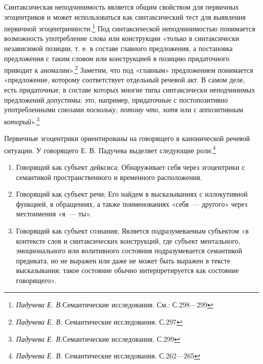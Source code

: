 \documentclass{kursa4}
\begin{document}
{      Синтаксическая неподчинимость является общим свойством для первичных
      эгоцентриков и может использоваться как синтаксический тест для
      выявления первичной
      эгоцентричности.\footnote{\textit{Падучева Е. В.}Семантические исследования. См.: С.298—299} Под синтаксической неподчинимостью понимается возможность употребление слова или
      конструкции «только в синтаксически независимой позиции, т. е. в
      составе главного предложения, а постановка предложения с таким словом
      или конструкцией в позицию придаточного приводит к
      аномалии».\footnote{\textit{ Падучева Е. В.
      }Семантические исследования. С.297} Заметим, что под «главным»
      предложением понимается «предложение, которому соответствует отдельный
      речевой акт. В самом деле, есть придаточные, в составе которых многие
      типы синтаксически неподчинимых предложений допустимы: это, например,
      придаточные с постопозитивно употребленными союзами \textit{поскольку,
      потому что, хотя} или с аппозитивным
      \textit{который}».\footnote{\textit{Падучева Е. В.}Семантические исследования. С.299}

      Первичные эгоцентрики ориентированы на говорящего в канонической
      речевой ситуации. У говорящего Е. В. Падучева выделяет следующие
      роли:\footnote{\textit{Падучева Е. В.} Семантические исследования. С.262—265}

      \liststyleWWNumiii
      \begin{enumerate}

        \item Говорящий как субъект дейксиса; \newline
        Обнаруживает себя через эгоцентрики с семантикой пространственного и
        временного расположения. 

        \item Говорящий как субъект речи; \newline
        Его найдем в высказываниях с иллокутивной функцией, в обращениях, а
        также поименованиях «себя~--- другого» через местоимения «я~--- ты».

        \item Говорящий как субъект сознания; \newline
        Является подразумеваемым субъектом «в контексте слов и синтаксических
        конструкций, где субъект ментального, эмоционального или волитивного
        состояния подразумевается семантикой предиката, но не выражен или даже
        не может быть выражен в тексте высказывания; такое состояние обычно
        интерпретируется как состояние говорящего». 


\end{enumerate}}
\end{document}
